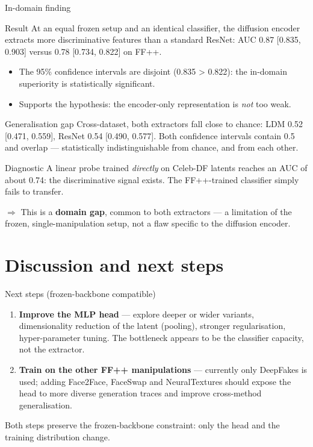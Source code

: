 \documentclass[aspectratio=169,11pt]{beamer}
\begin{document}
\begin{frame}{In-domain finding}
  \begin{block}{Result}
    At an equal frozen setup and an identical classifier, the diffusion
    encoder extracts \alert{more discriminative} features than a standard
    ResNet: AUC 0.87 [0.835, 0.903] versus 0.78 [0.734, 0.822] on FF++.
  \end{block}
  \medskip
  \begin{itemize}
    \item The 95\% confidence intervals are \alert{disjoint}
          (0.835 > 0.822): the in-domain superiority is statistically
          significant.
    \item Supports the hypothesis: the encoder-only representation is
          \emph{not} too weak.
  \end{itemize}
\end{frame}

\begin{frame}{Generalisation gap}
  Cross-dataset, both extractors fall close to chance: LDM
  0.52 [0.471, 0.559], ResNet 0.54 [0.490, 0.577]. Both confidence
  intervals contain 0.5 and overlap --- statistically indistinguishable
  from chance, and from each other.

  \medskip
  \begin{block}{Diagnostic}
    A linear probe trained \emph{directly} on Celeb-DF latents reaches an
    AUC of about 0.74: the discriminative signal \alert{exists}. The
    FF++-trained classifier simply fails to transfer.
  \end{block}
  \medskip
  $\Rightarrow$ This is a \textbf{domain gap}, common to both extractors --- a
  limitation of the frozen, single-manipulation setup, not a flaw specific to
  the diffusion encoder.
\end{frame}

\section{Discussion and next steps}

\begin{frame}{Next steps (frozen-backbone compatible)}
  \begin{enumerate}
    \item \textbf{Improve the MLP head} --- explore deeper or wider
          variants, dimensionality reduction of the latent (pooling),
          stronger regularisation, hyper-parameter tuning. The bottleneck
          appears to be the classifier capacity, not the extractor.
    \item \textbf{Train on the other FF++ manipulations} --- currently
          only DeepFakes is used; adding Face2Face, FaceSwap and
          NeuralTextures should expose the head to more diverse generation
          traces and improve cross-method generalisation.
  \end{enumerate}
  \medskip
  Both steps preserve the frozen-backbone constraint: only the head and the
  training distribution change.
\end{frame}
\end{document}
